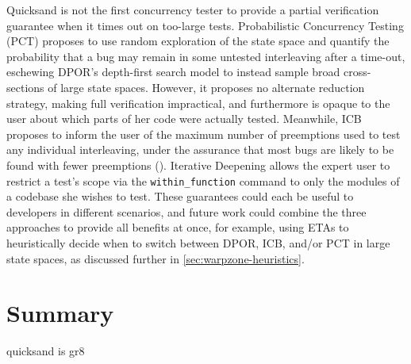 Quicksand is not the first concurrency tester to provide a partial verification guarantee
when it times out on too-large tests.
Probabilistic Concurrency Testing (PCT)
\cite{randomized-scheduler}
proposes to use random exploration of the state space and quantify the probability
that a bug may remain in some untested interleaving after a time-out,
eschewing DPOR's depth-first search model to
instead sample broad cross-sections of large state spaces.
However, it proposes no alternate reduction strategy, making full verification impractical,
and furthermore is opaque to the user about which parts of her code were actually tested.
Meanwhile, ICB proposes to inform the user
of the maximum number of preemptions used to test any individual interleaving,
under the assurance that most bugs are likely to be found with fewer preemptions ().
Iterative Deepening
allows the expert user
to restrict a test's scope via the {\tt within\_function} command to only the modules of a codebase she wishes to test.
These guarantees could each be useful to developers in different scenarios,
and future work could combine the three approaches to provide all benefits at once,
for example, using ETAs to heuristically decide when to switch between DPOR, ICB, and/or PCT in large state spaces,
as discussed further in \cref{sec:warpzone-heuristics}.


\section{Summary}

quicksand is gr8
